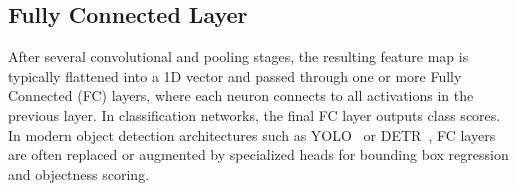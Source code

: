 \subsection{Fully Connected Layer}
After several convolutional and pooling stages, the resulting feature map is typically flattened into a 1D vector and passed through one or more Fully Connected (FC) layers, where each neuron connects to all activations in the previous layer. In classification networks, the final FC layer outputs class scores. In modern object detection architectures such as YOLO~\cite{YOLO} or DETR~\cite{DETR}, FC layers are often replaced or augmented by specialized heads for bounding box regression and objectness scoring.